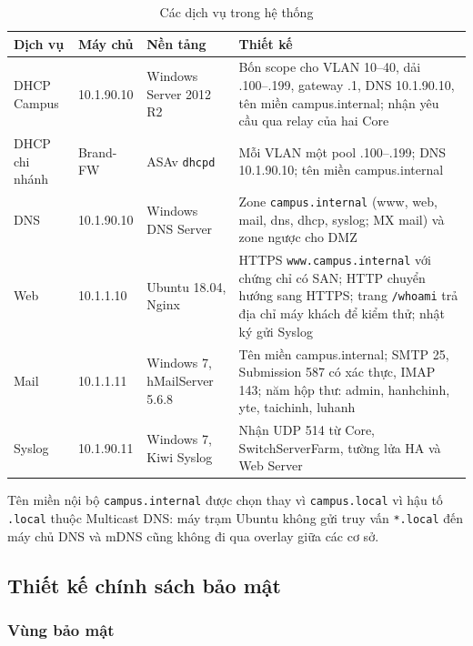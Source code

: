\begin{table}[H]
    \centering
    \small
    \caption{Các dịch vụ trong hệ thống}
    \label{tab:dich_vu}
    \begin{tabularx}{\textwidth}{|P{2.4cm}|P{2.6cm}|P{3.2cm}|X|}
        \hline
        \textbf{Dịch vụ} & \textbf{Máy chủ} & \textbf{Nền tảng} & \textbf{Thiết kế} \\
        \hline
        DHCP Campus & 10.1.90.10 & Windows Server 2012 R2 & Bốn scope cho VLAN 10--40, dải .100--.199, gateway .1, DNS 10.1.90.10, tên miền campus.internal; nhận yêu cầu qua relay của hai Core \\
        \hline
        DHCP chi nhánh & Brand-FW & ASAv \texttt{dhcpd} & Mỗi VLAN một pool .100--.199; DNS 10.1.90.10; tên miền campus.internal \\
        \hline
        DNS & 10.1.90.10 & Windows DNS Server & Zone \texttt{campus.internal} (www, web, mail, dns, dhcp, syslog; MX mail) và zone ngược cho DMZ \\
        \hline
        Web & 10.1.1.10 & Ubuntu 18.04, Nginx & HTTPS \texttt{www.campus.internal} với chứng chỉ có SAN; HTTP chuyển hướng sang HTTPS; trang \texttt{/whoami} trả địa chỉ máy khách để kiểm thử; nhật ký gửi Syslog \\
        \hline
        Mail & 10.1.1.11 & Windows 7, hMailServer 5.6.8 & Tên miền campus.internal; SMTP 25, Submission 587 có xác thực, IMAP 143; năm hộp thư: admin, hanhchinh, yte, taichinh, luhanh \\
        \hline
        Syslog & 10.1.90.11 & Windows 7, Kiwi Syslog & Nhận UDP 514 từ Core, SwitchServerFarm, tường lửa HA và Web Server \\
        \hline
    \end{tabularx}
\end{table}

Tên miền nội bộ \texttt{campus.internal} được chọn thay vì \texttt{campus.local} vì hậu tố \texttt{.local} thuộc Multicast DNS: máy trạm Ubuntu không gửi truy vấn \texttt{*.local} đến máy chủ DNS và mDNS cũng không đi qua overlay giữa các cơ sở.

\subsection{Thiết kế chính sách bảo mật}

\subsubsection{Vùng bảo mật}

